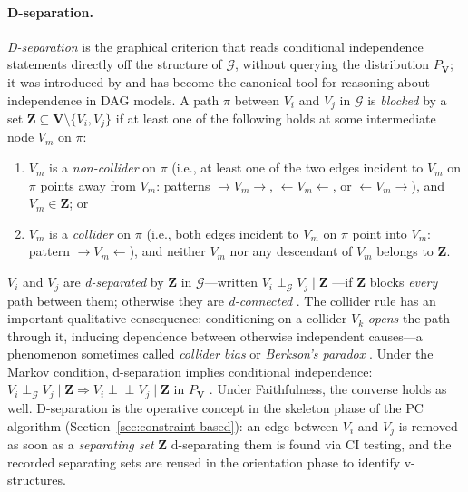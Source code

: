 \paragraph{D-separation.}
\emph{D-separation} is the graphical criterion that reads conditional independence statements directly off the structure of $\mathcal{G}$, without querying the distribution $P_{\mathbf{V}}$; it was introduced by \textcite{1988ProbabilisticRI} and has become the canonical tool for reasoning about independence in DAG models.
A path $\pi$ between $V_i$ and $V_j$ in $\mathcal{G}$ is
\emph{blocked} by a set $\mathbf{Z} \subseteq \mathbf{V} \setminus
\{V_i, V_j\}$ if at least one of the following holds at some
intermediate node $V_m$ on $\pi$:
\begin{enumerate}[label=(\roman*)]
    \item $V_m$ is a \emph{non-collider} on $\pi$
          (i.e., at least one of the two edges incident to $V_m$ on
          $\pi$ points away from $V_m$: patterns
          $\to V_m \to$, $\leftarrow V_m \leftarrow$, or
          $\leftarrow V_m \to$),
          and $V_m \in \mathbf{Z}$; or
    \item $V_m$ is a \emph{collider} on $\pi$
          (i.e., both edges incident to $V_m$ on $\pi$ point into
          $V_m$: pattern $\to V_m \leftarrow$),
          and neither $V_m$ nor any descendant of $V_m$ belongs to
          $\mathbf{Z}$.
\end{enumerate}
$V_i$ and $V_j$ are \emph{d-separated} by $\mathbf{Z}$ in
$\mathcal{G}$---written $V_i \perp_{\mathcal{G}} V_j \mid \mathbf{Z}$
---if $\mathbf{Z}$ blocks \emph{every} path between them;
otherwise they are \emph{d-connected} \cite{1988ProbabilisticRI, Pearl_2009}.
The collider rule has an important qualitative consequence: conditioning
on a collider $V_k$ \emph{opens} the path through it, inducing
dependence between otherwise independent causes---a phenomenon
sometimes called \emph{collider bias} or \emph{Berkson's paradox}
\cite{Pearl_2009}.
Under the Markov condition, d-separation implies conditional
independence: $V_i \perp_{\mathcal{G}} V_j \mid \mathbf{Z}
\Rightarrow V_i \perp\!\!\!\perp V_j \mid \mathbf{Z}$ in
$P_{\mathbf{V}}$ \cite{1988ProbabilisticRI, Pearl_2009}.
Under Faithfulness, the converse holds as well.
D-separation is the operative concept in the skeleton phase of the PC
algorithm (Section~\ref{sec:constraint-based}): an edge between
$V_i$ and $V_j$ is removed as soon as a \emph{separating set}
$\mathbf{Z}$ d-separating them is found via CI testing, and the
recorded separating sets are reused in the orientation phase to
identify v-structures.

